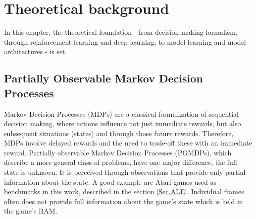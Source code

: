 \section{Theoretical background} \label{Sec.TheoreticalBackground}

In this chapter, the theoretical foundation - from decision making formalism, through reinforcement learning and deep learning, to model learning and model architectures - is set.

\subsection{Partially Observable Markov Decision Processes} \label{Sec.POMDP}

Markov Decision Processes (MDPs) are a classical formalization of sequential decision making, where actions influence not just immediate rewards, but also subsequent situations (states) and through those future rewards. Therefore, MDPs involve delayed rewards and the need to trade-off these with an immediate reward.
Partially observable Markov Decision Processes (POMDPs), which describe a more general class of problems, have one major difference, the full state is unknown. It is perceived through observations that provide only partial information about the state. A good example are Atari games used as benchmarks in this work, described in the section \ref{Sec.ALE}. Individual frames often does not provide full information about the game's state which is held in the game's RAM.


